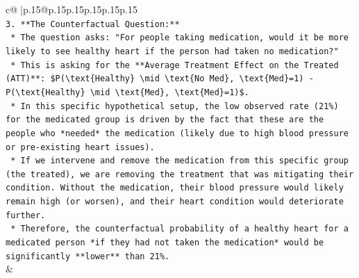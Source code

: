 \documentclass{article}
\begin{document}
{\begin{supertabular}{c@{$\;$}|p{.15\linewidth}@{}p{.15\linewidth}p{.15\linewidth}p{.15\linewidth}p{.15\linewidth}p{.15\linewidth}}
{{{\\ 
\texttt{3.  **The Counterfactual Question:**} \\
\texttt{    *   The question asks: "For people taking medication, would it be more likely to see healthy heart if the person had taken no medication?"} \\
\texttt{    *   This is asking for the **Average Treatment Effect on the Treated (ATT)**: \$P(\textbackslash{}text\{Healthy\} \textbackslash{}mid \textbackslash{}text\{No Med\}, \textbackslash{}text\{Med\}=1) {-} P(\textbackslash{}text\{Healthy\} \textbackslash{}mid \textbackslash{}text\{Med\}, \textbackslash{}text\{Med\}=1)\$.} \\
\texttt{    *   In this specific hypothetical setup, the low observed rate (21\%) for the medicated group is driven by the fact that these are the people who *needed* the medication (likely due to high blood pressure or pre{-}existing heart issues).} \\
\texttt{    *   If we intervene and remove the medication from this specific group (the treated), we are removing the treatment that was mitigating their condition. Without the medication, their blood pressure would likely remain high (or worsen), and their heart condition would deteriorate further.} \\
\texttt{    *   Therefore, the counterfactual probability of a healthy heart for a medicated person *if they had not taken the medication* would be significantly **lower** than 21\%.} \\
            }
        }
    }
    & \\ \\


\end{supertabular}}
\end{document}
